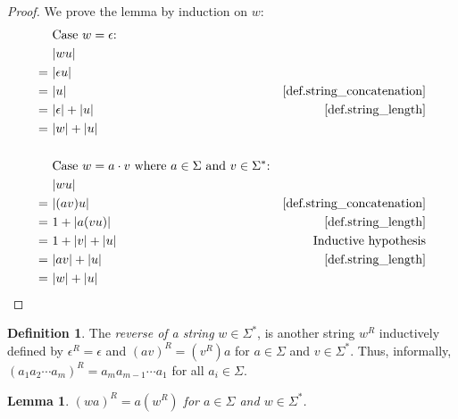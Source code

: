 \documentclass{report}
\DeclarePairedDelimiter{\abs}{\lvert}{\rvert}
\newtheorem{lemma}[theorem]{Lemma}
\theoremstyle{definition}
\newtheorem{definition}[theorem]{Definition}
\begin{document}
\begin{appendices}
\begin{proof}
We prove the lemma by induction on $w$:
\begin{align*}
& \text{Case } w = \epsilon \text{:} \\
& \abs{wu} \\
= \ & \abs{\epsilon u} \\
= \ & \abs{u}
& \text{\cref{def.string_concatenation}} \\
= \ & \abs{\epsilon} + \abs{u}
& \text{\cref{def.string_length}} \\
= \ & \abs{w} + \abs{u} \\
\\
& \text{Case } w = a \cdot v \text{ where } a \in \Sigma \text{ and }
v \in \Sigma^{\ast} \text{:} \\
& \abs{wu} \\
= \ & \abs{(av)u}
& \text{\cref{def.string_concatenation}} \\
= \ & 1 + \abs{a(vu)}
& \text{\cref{def.string_length}} \\
= \ & 1 + \abs{v} + \abs{u}
& \text{Inductive hypothesis} \\
= \ & \abs{av} + \abs{u}
& \text{\cref{def.string_length}} \\
= \ & \abs{w} + \abs{u} \\
\end{align*}
\end{proof}

\begin{definition} \label{def.reverse_string}
The \emph{reverse of a string} $w \in \Sigma^{\ast}$, is another string $w^R$
inductively defined by $\epsilon^R = \epsilon$ and $(av)^R = (v^R) a$ for 
$a \in \Sigma$ and $v \in \Sigma^{\ast}$. Thus, informally,
$(a_1 a_2 \cdots a_m)^R = a_m a_{m-1} \cdots a_1$ for all $a_i \in \Sigma$.
\end{definition}

\begin{lemma} \label{lma.reverse_string_alternative}
$(wa)^R = a (w^R)$ for $a \in \Sigma$ and $w \in \Sigma^{\ast}$.
\end{lemma}


\end{appendices}
\end{document}
